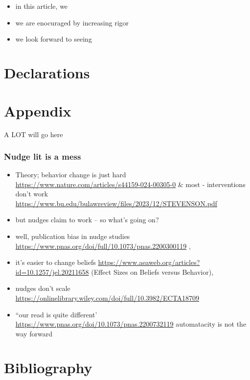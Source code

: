 \documentclass[sn-nature,pdflatex]{sn-jnl}
\providecommand{\tightlist}{%
  \setlength{\itemsep}{0pt}\setlength{\parskip}{0pt}}
\begin{document}
\begin{itemize}
\tightlist
\item
  in this article, we
\item
  we are enocuraged by increasing rigor
\item
  we look forward to seeing
\end{itemize}

\backmatter



\section*{Declarations}\label{declarations}

\section{Appendix}\label{secA1}

A LOT will go here

\subsubsection{Nudge lit is a mess}\label{nudge-lit-is-a-mess}

\begin{itemize}
\item
  Theory; behavior change is just hard
  \url{https://www.nature.com/articles/s44159-024-00305-0} \& most -
  interventions don't work
  \url{https://www.bu.edu/bulawreview/files/2023/12/STEVENSON.pdf}
\item
  but nudges claim to work -- so what's going on?
\item
  well, publication bias in nudge studies
  \url{https://www.pnas.org/doi/full/10.1073/pnas.2200300119} ,
\item
  it's easier to change beliefs
  \url{https://www.aeaweb.org/articles?id=10.1257/jel.20211658} (Effect
  Sizes on Beliefs versus Behavior),
\item
  nudges don't scale
  \url{https://onlinelibrary.wiley.com/doi/full/10.3982/ECTA18709}
\item
  ``our read is quite different'
  \url{https://www.pnas.org/doi/10.1073/pnas.2200732119} automatacity is
  not the way forward
\end{itemize}

\section{Bibliography}\label{bibliography}

\renewcommand\refname{References}

\end{document}

